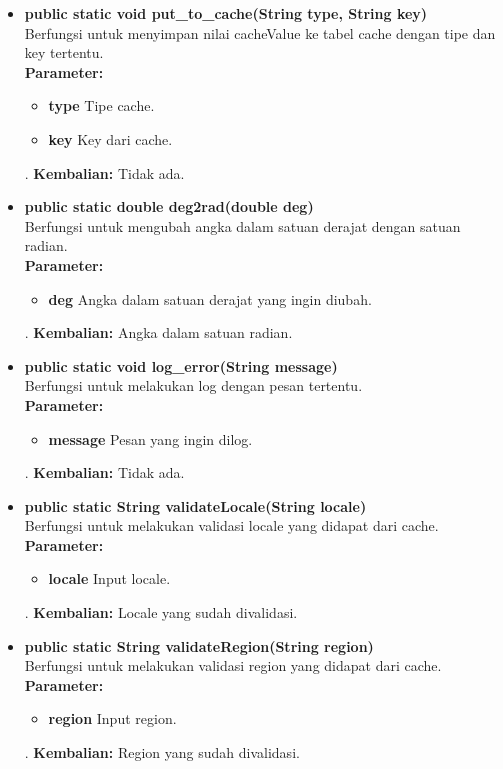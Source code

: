 \begin{enumerate}
\begin{itemize}
		\item \textbf{public static void put\_to\_cache(String type, String key)}\\
		Berfungsi untuk menyimpan nilai cacheValue ke tabel cache dengan tipe dan key tertentu.\\
		\textbf{Parameter:}
				\begin{itemize}
					\item \textbf{type} Tipe cache.
					\item \textbf{key} Key dari cache.
				\end{itemize}.
		\textbf{Kembalian:}  Tidak ada.
	
		\item \textbf{public static double deg2rad(double deg)}\\
		Berfungsi untuk mengubah angka dalam satuan derajat dengan satuan radian.\\
		\textbf{Parameter:}
				\begin{itemize}
					\item \textbf{deg} Angka dalam satuan derajat yang ingin diubah.
				\end{itemize}.
		\textbf{Kembalian:}  Angka dalam satuan radian.
	
		\item \textbf{public static void log\_error(String message)}\\
		Berfungsi untuk melakukan log dengan pesan tertentu.\\
		\textbf{Parameter:}
				\begin{itemize}
					\item \textbf{message} Pesan yang ingin dilog.
				\end{itemize}.
		\textbf{Kembalian:}  Tidak ada.
		
		\item \textbf{public static String validateLocale(String locale)}\\
		Berfungsi untuk melakukan validasi locale yang didapat dari cache.\\
		\textbf{Parameter:}
				\begin{itemize}
					\item \textbf{locale} Input locale.
				\end{itemize}.
		\textbf{Kembalian:}  Locale yang sudah divalidasi.
		
		\item \textbf{public static String validateRegion(String region)}\\
		Berfungsi untuk melakukan validasi region yang didapat dari cache.\\
		\textbf{Parameter:}
				\begin{itemize}
					\item \textbf{region} Input region.
				\end{itemize}.
		\textbf{Kembalian:}  Region yang sudah divalidasi.
		
	\end{itemize}
	
\end{enumerate}


